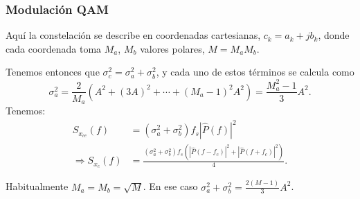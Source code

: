 \newpage

\subsubsection*{Modulación QAM}

Aquí la constelación se describe en coordenadas cartesianas, $c_k = a_k+j b_k$, donde
cada coordenada toma $M_a$, $M_b$ valores polares, $M=M_a M_b$.

\begin{figure}[htb]
    \centering\begin{minipage}{\textwidth}
    \endpgfgraphicnamed\end{minipage}
\end{figure}
\FloatBarrier


Tenemos entonces que $\sigma_c^2 = \sigma_a^2+\sigma_b^2$, y cada uno de estos términos se calcula como
\[
\sigma_a^2 = \frac{2}{M_a}\left(A^2 +
(3A)^2+\cdots+(M_a-1)^2A^2\right) = \frac{M_a^2-1}{3}A^2.\]
Tenemos:
\begin{align*}
S_{x_{ce}}(f) &= (\sigma_a^2+\sigma_b^2) f_s |\hat{P}(f)|^2 \\
\Rightarrow S_{x_c}(f) &=
\frac{(\sigma_a^2+\sigma_b^2)f_s\left(|\hat{P}(f-f_c)|^2 +
|\hat{P}(f+f_c)|^2\right)}{4}.
\end{align*}



Habitualmente $M_a = M_b = \sqrt{M}$. En ese caso
$\sigma_a^2+\sigma_b^2 = \frac{2(M-1)}{3}A^2$.





